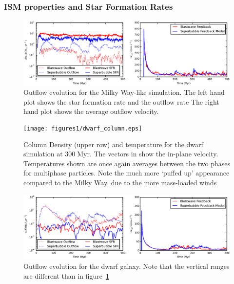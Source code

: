 \subsubsection{ISM properties and Star Formation Rates}\label{ISM}
\begin{figure}
    \includegraphics[width=\textwidth]{figures1/milkyway_outflow.eps}
    \caption[Outflow evolution in isolated Milky Way]{Outflow evolution for the
    Milky Way-like simulation.  The left hand plot shows the star formation rate
    and the outflow rate The right hand plot shows the average outflow
    velocity.}
    \label{milkyway_outflow}
\end{figure}

\begin{figure}
    \texttt{[image: figures1/dwarf\_column.eps]}
    \caption[Column density and temperature images of isolated dwarf]{Column
    Density (upper row) and temperature for the dwarf simulation at
    $300\;\mathrm{Myr}$.  The vectors in show the in-plane velocity.
    Temperatures shown are once again averages between the two phases for
    multiphase particles.  Note the much more `puffed up' appearance compared to
    the Milky Way, due to the more mass-loaded winds}
    \label{dwarf_column}
\end{figure}

\begin{figure}
    \includegraphics[width=\textwidth]{figures1/dwarf_outflow.eps}
    \caption[Outflow evolution in isolated dwarf]{Outflow evolution for the
    dwarf galaxy.  Note that the vertical ranges are different than in
    figure~\ref{milkyway_outflow}}
    \label{dwarf_outflow}
\end{figure}

